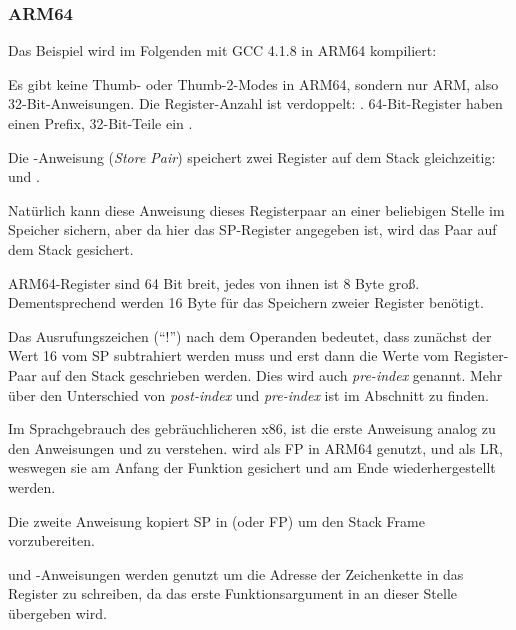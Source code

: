 \subsubsection{ARM64}


Das Beispiel wird im Folgenden mit GCC 4.1.8 in ARM64 kompiliert:



Es gibt keine Thumb- oder Thumb-2-Modes in ARM64, sondern nur ARM, also 32-Bit-Anweisungen.
Die Register-Anzahl ist verdoppelt: .
64-Bit-Register haben einen Prefix, 32-Bit-Teile ein .

Die -Anweisung (\emph{Store Pair}) speichert zwei Register auf dem Stack gleichzeitig:
 und .

Natürlich kann diese Anweisung dieses Registerpaar an einer beliebigen Stelle im Speicher
sichern, aber da hier das \ac{SP}-Register angegeben ist, wird das Paar auf dem Stack gesichert.

ARM64-Register sind 64 Bit breit, jedes von ihnen ist 8 Byte groß. Dementsprechend werden 16 Byte
für das Speichern zweier Register benötigt.

Das Ausrufungszeichen (``!'')  nach dem Operanden bedeutet, dass zunächst der Wert 16 vom \ac{SP}
subtrahiert werden muss und erst dann die Werte vom Register-Paar auf den Stack geschrieben werden.
Dies wird auch \emph{pre-index} genannt.
Mehr über den Unterschied von \emph{post-index} und \emph{pre-index} ist im Abschnitt
 zu finden.

Im Sprachgebrauch des gebräuchlicheren x86, ist die erste Anweisung analog zu den Anweisungen
 und  zu verstehen.
 wird als \ac{FP} in ARM64 genutzt, und  als \ac{LR}, weswegen sie am Anfang der
Funktion gesichert und am Ende wiederhergestellt werden.

Die zweite Anweisung kopiert \ac{SP} in  (oder \ac{FP}) um den Stack Frame vorzubereiten.

\label{pointers_ADRP_and_ADD}
 und \ADD-Anweisungen werden genutzt um die Adresse der Zeichenkette  in das
Register  zu schreiben, da das erste Funktionsargument in an dieser Stelle übergeben wird. 

